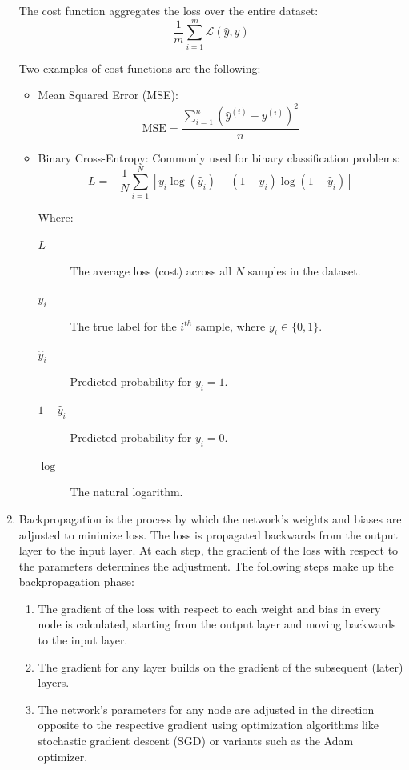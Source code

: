 \begin{enumerate}
			The cost function aggregates the loss over the entire dataset:
			$$
			\frac{1}{m} \sum_{i=1}^m \mathcal{L}(\hat{y}, y)
			$$
			
			\bigskip
			Two examples of cost functions are the following:
			\begin{itemize}
				\item Mean Squared Error (MSE):
				\begin{equation}
					\text{MSE} = \frac{\sum_{i=1}^n (\hat{y}^{(i)} - y^{(i)})^2}{n}
				\end{equation}

				
				\item Binary Cross-Entropy:
				Commonly used for binary classification problems:
				\begin{equation}
					L = -\frac{1}{N} \sum_{i=1}^N \left[ y_i \log(\hat{y}_i) + (1 - y_i) \log(1 - \hat{y}_i) \right]
				\end{equation}

				\bigskip
				Where:
				\begin{description}
					\item[$L$] The average loss (cost) across all $N$ samples in the dataset.
					\item[$y_i$] The true label for the $i^{th}$ sample, where $y_i \in \{0, 1\}$.
					\item[$\hat{y}_i$] Predicted probability for $y_i = 1$.
					\item[$1 - \hat{y}_i$] Predicted probability for $y_i = 0$.
					\item[$\log$] The natural logarithm.
				\end{description}
				\bigskip

			\end{itemize}
			\bigskip
			
			\item Backpropagation is the process by which the network's weights and biases are adjusted to minimize loss. The loss is propagated backwards from the output layer to the input layer. At each step, the gradient of the loss with respect to the parameters determines the adjustment. The following steps make up the backpropagation phase:
			
			\bigskip
			\begin{enumerate}
				\item The gradient of the loss with respect to each weight and bias in every node is calculated, starting from the output layer and moving backwards to the input layer.
				\item The gradient for any layer builds on the gradient of the subsequent (later) layers.
				\item The network's parameters for any node are adjusted in the direction opposite to the respective gradient using optimization algorithms like stochastic gradient descent (SGD) or variants such as the Adam optimizer.
			\end{enumerate}
		\end{enumerate}


